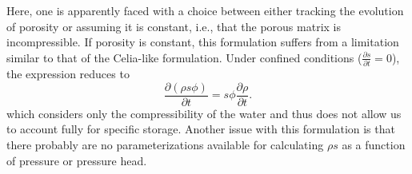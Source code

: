 \documentclass[fleqn]{article}
\begin{document}
{Here, one is apparently faced with a choice between either tracking the evolution of porosity or assuming it is constant, i.e., that the porous matrix is incompressible. If porosity is constant, this formulation suffers from a limitation similar to that of the Celia-like formulation. Under confined conditions ($\frac{\partial s}{\partial t} = 0$), the expression reduces to
\begin{equation}
  \frac{\partial (\rho s \phi)}{\partial t}
  = s \phi \frac{\partial \rho}{\partial t} .
\label{eq-sto-const-phi}
\end{equation}
which considers only the compressibility of the water and thus does not allow us to account fully for specific storage. Another issue with this formulation is that there probably are no parameterizations available for calculating $\rho s$ as a function of pressure or pressure head.

}



\end{document}
